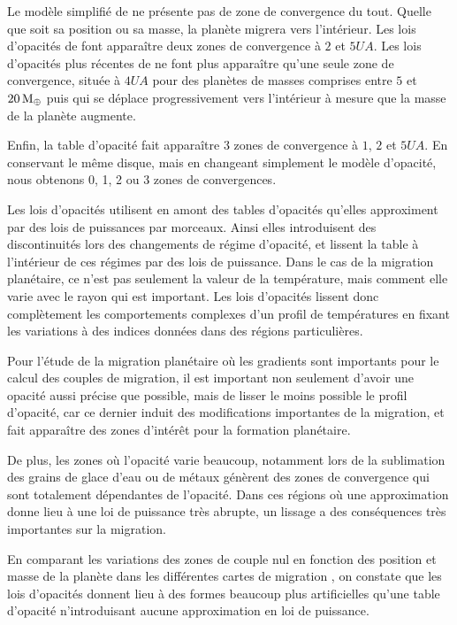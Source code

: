 Le modèle simplifié de \cite{chambers2009analytic} ne présente pas de zone de convergence du tout. Quelle que soit sa position ou sa masse, la planète migrera vers l'intérieur. Les lois d'opacités de \cite{bell1994FU} font apparaître deux zones de convergence à $2$ et $5\unit{UA}$. Les lois d'opacités plus récentes de \cite{zhu2009nonsteady} ne font plus apparaître qu'une seule zone de convergence, située à $4\unit{UA}$ pour des planètes de masses comprises entre $5$ et $20\mathrm{\thinspace M_\oplus}$ puis qui se déplace progressivement vers l'intérieur à mesure que la masse de la planète augmente. 

Enfin, la table d'opacité \cite{hure2000transition} fait apparaître 3 zones de convergence à $1$, $2$ et $5\unit{UA}$. En conservant le même disque, mais en changeant simplement le modèle d'opacité, nous obtenons 0, 1, 2 ou 3 zones de convergences. 

Les lois d'opacités utilisent en amont des tables d'opacités qu'elles approximent par des lois de puissances par morceaux. Ainsi elles introduisent des discontinuités lors des changements de régime d'opacité, et lissent la table à l'intérieur de ces régimes par des lois de puissance. Dans le cas de la migration planétaire, ce n'est pas seulement la valeur de la température, mais comment elle varie avec le rayon qui est important. Les lois d'opacités lissent donc complètement les comportements complexes d'un profil de températures en fixant les variations à des indices données dans des régions particulières. 

Pour l'étude de la migration planétaire où les gradients sont importants pour le calcul des couples de migration, il est important non seulement d'avoir une opacité aussi précise que possible, mais de lisser le moins possible le profil d'opacité, car ce dernier induit des modifications importantes de la migration, et fait apparaître des zones d'intérêt pour la formation planétaire. 

De plus, les zones où l'opacité varie beaucoup, notamment lors de la sublimation des grains de glace d'eau ou de métaux génèrent des zones de convergence qui sont totalement dépendantes de l'opacité. Dans ces régions où une approximation donne lieu à une loi de puissance très abrupte, un lissage a des conséquences très importantes sur la migration. 

En comparant les variations des zones de couple nul en fonction des position et masse de la planète dans les différentes cartes de migration , on constate que les lois d'opacités \citep{bell1994FU, zhu2009nonsteady, chambers2009analytic} donnent lieu à des formes beaucoup plus artificielles qu'une table d'opacité \citep{hure2000transition} n'introduisant aucune approximation en loi de puissance.

